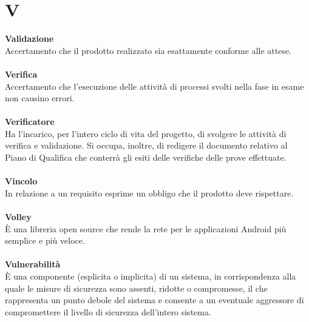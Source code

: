 \section{V}
\textbf{Validazione}\\
Accertamento che il prodotto realizzato sia esattamente conforme alle attese. \\ \\
\textbf{Verifica}\\
Accertamento che l'esecuzione delle attività di processi svolti nella fase in esame non causino errori. \\ \\
\textbf{Verificatore}\\
Ha l'incarico, per l'intero ciclo di vita del progetto, di svolgere le attività di verifica e validazione. Si occupa, inoltre, di redigere il documento relativo al Piano di Qualifica che conterrà gli esiti delle verifiche delle prove effettuate. \\ \\
\textbf{Vincolo}\\
In relazione a un requisito esprime un obbligo che il prodotto deve rispettare. \\ \\
\textbf{Volley}\\
È una libreria open source che rende la rete per le applicazioni Android più semplice e più veloce. \\ \\
\textbf{Vulnerabilità}\\
È una componente (esplicita o implicita) di un sistema, in corrispondenza alla quale le misure di sicurezza sono assenti, ridotte o compromesse, il che rappresenta un punto 
debole del sistema e consente a un eventuale aggressore di compromettere il livello di sicurezza dell'intero sistema. \\ \\
\clearpage